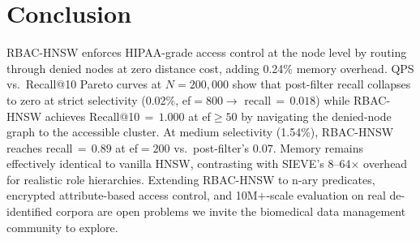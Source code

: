 \section{Conclusion}
\label{sec:conclusion}

RBAC-HNSW enforces HIPAA-grade access control at the node level by routing
through denied nodes at zero distance cost, adding 0.24\% memory overhead.
QPS vs.\ Recall@10 Pareto curves at $N\!=\!200{,}000$ show that post-filter
recall collapses to zero at strict selectivity (0.02\%, ef$\!=\!800 \to$
recall$\,{=}\,0.018$) while RBAC-HNSW achieves Recall@10\,${=}\,1.000$ at
ef$\!\geq\!50$ by navigating the denied-node graph to the accessible cluster.
At medium selectivity (1.54\%), RBAC-HNSW reaches recall$\,{=}\,0.89$ at
ef$\!=\!200$ vs.\ post-filter's $0.07$.
Memory remains effectively identical to vanilla HNSW, contrasting with SIEVE's
8--64$\times$ overhead for realistic role hierarchies.
Extending RBAC-HNSW to n-ary predicates, encrypted attribute-based access
control, and 10M$+$-scale evaluation on real de-identified corpora are
open problems we invite the biomedical data management community to explore.
